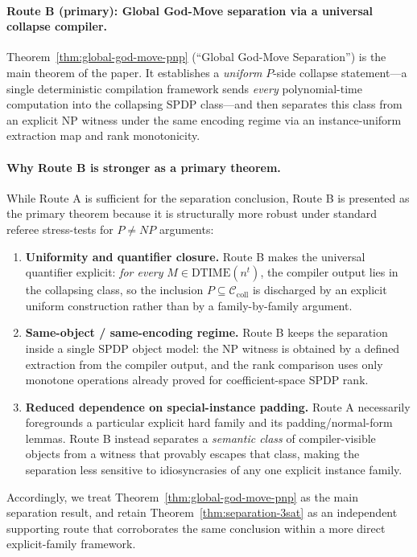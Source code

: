 \documentclass[12pt]{article}
\theoremstyle{definition}
\theoremstyle{definition}
\theoremstyle{remark}
\theoremstyle{remark}
\begin{document}
\paragraph{Route B (primary): Global God-Move separation via a universal collapse compiler.}
Theorem~\ref{thm:global-god-move-pnp} (``Global God-Move Separation'') is the
main theorem of the paper. It establishes a \emph{uniform} $P$-side collapse
statement---a single deterministic compilation framework sends \emph{every}
polynomial-time computation into the collapsing SPDP class---and then separates
this class from an explicit NP witness under the same encoding regime via an
instance-uniform extraction map and rank monotonicity.

\paragraph{Why Route B is stronger as a primary theorem.}
While Route A is sufficient for the separation conclusion, Route B is presented
as the primary theorem because it is structurally more robust under standard
referee stress-tests for $P\neq NP$ arguments:
\begin{enumerate}[label=(\roman*)]
\item \textbf{Uniformity and quantifier closure.}
Route B makes the universal quantifier explicit: \emph{for every}
$M\in \mathrm{DTIME}(n^t)$, the compiler output lies in the collapsing class,
so the inclusion $P\subseteq \mathcal{C}_{\mathrm{coll}}$ is discharged by an
explicit uniform construction rather than by a family-by-family argument.

\item \textbf{Same-object / same-encoding regime.}
Route B keeps the separation inside a single SPDP object model: the NP witness
is obtained by a defined extraction from the compiler output, and the
rank comparison uses only monotone operations already proved for
coefficient-space SPDP rank.

\item \textbf{Reduced dependence on special-instance padding.}
Route A necessarily foregrounds a particular explicit hard family and its
padding/normal-form lemmas. Route B instead separates a \emph{semantic class}
of compiler-visible objects from a witness that provably escapes that class,
making the separation less sensitive to idiosyncrasies of any one explicit
instance family.
\end{enumerate}

Accordingly, we treat Theorem~\ref{thm:global-god-move-pnp} as the main separation
result, and retain Theorem~\ref{thm:separation-3sat} as an independent supporting
route that corroborates the same conclusion within a more direct explicit-family
framework.
\end{document}

